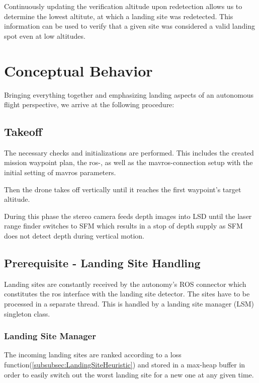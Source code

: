 Continuously updating the verification altitude upon redetection allows us to determine the lowest altitute, at which a landing site was redetected. This information can be used to verify that a given site was considered a valid landing spot even at low altitudes. 

\section{Conceptual Behavior}

Bringing everything together and emphasizing landing aspects of an autonomous flight perspective, we arrive at the following procedure:

\subsection{Takeoff}

The necessary checks and initializations are performed. This includes the created mission waypoint plan, the ros-, as well as the mavros-connection setup with the initial setting of mavros parameters.

Then the drone takes off vertically until it reaches the first waypoint's target altitude.

During this phase the stereo camera feeds depth images into LSD until the laser range finder switches to SFM which results in a stop of depth supply as SFM does not detect depth during vertical motion.



\subsection{Prerequisite - Landing Site Handling}

Landing sites are constantly received by the autonomy's ROS connector which constitutes the ros interface with the landing site detector. The sites have to be processed in a separate thread. This is handled by a landing site manager (LSM) singleton class.

\subsubsection{Landing Site Manager}

The incoming landing sites are ranked according to a loss function(\ref{subsubsec:LandingSiteHeuristic}) and stored in a max-heap buffer in order to easily switch out the worst landing site for a new one at any given time.

